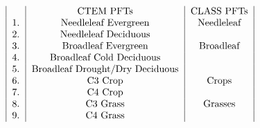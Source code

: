 \[ \begin{tabular}{ | l | c | c | } & CTEM PFTs & CLASS PFTs \\ 1. & Needleleaf Evergreen & Needleleaf \\ 2. & Needleleaf Deciduous & \\ 3. & Broadleaf Evergreen & Broadleaf \\ 4. & Broadleaf Cold Deciduous & \\ 5. & Broadleaf Drought/Dry Deciduous & \\ 6. & C3 Crop & Crops \\ 7. & C4 Crop & \\ 8. & C3 Grass & Grasses \\ 9. & C4 Grass & \\ \end{tabular} \] 